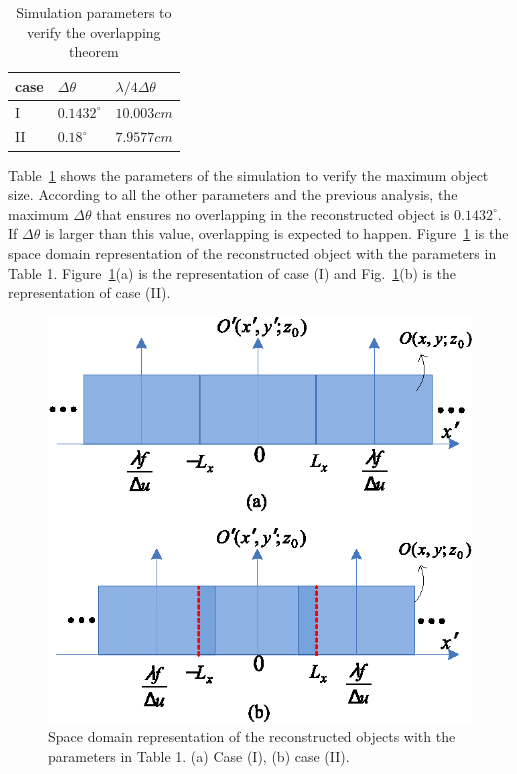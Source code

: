 \documentclass[10pt,letterpaper]{article}
\begin{document}
\begin{table}[htbp]
\centering\caption{Simulation parameters to verify the overlapping theorem}
\begin{tabular}{l l l}
\hline
case  & $\Delta\theta$  & $\lambda/4\Delta \theta$     \\ \hline
I     & $0.1432^\circ$  & $10.003cm$                   \\ 
II    & $0.18^\circ$    & $7.9577cm$                   \\ \hline
\end{tabular}
\label{lb_1}
\end{table}

Table~\ref{lb_1} shows the parameters of the simulation to verify the maximum object size. According to all the other parameters and the previous analysis, the maximum $\Delta\theta$ that ensures no overlapping in the reconstructed object is $0.1432^\circ$. If $\Delta\theta$ is larger than this value, overlapping is expected to happen. Figure~\ref{fig_11} is the space domain representation of the reconstructed object with the parameters in Table 1. Figure~\ref{fig_11}(a) is the representation of case (I) and Fig.~\ref{fig_11}(b) is the representation of case (II).

\begin{figure}[htbp]
\centering\includegraphics[width=.4\columnwidth]{fig_11}
\caption{Space domain representation of the reconstructed objects with the parameters in Table 1. (a) Case (I), (b) case (II). }
\label{fig_11}
\end{figure}
\end{document}
